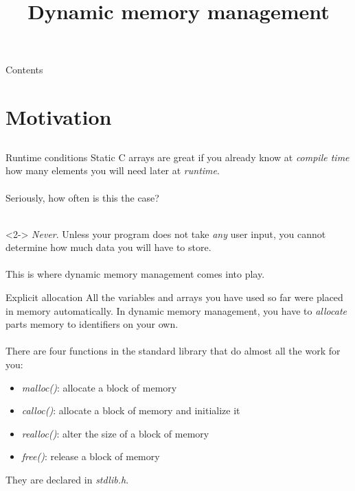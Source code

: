 
\newcommand{\topic}{
	Dynamic memory management
}
\usepackage{tikz}
\usetikzlibrary{arrows}
\usetikzlibrary{decorations.pathmorphing}

\title{\topic}
\supertitle{\course}
\date{}



\maketitle

\begin{frame}{Contents}
	\tableofcontents
\end{frame}

\section{Motivation}
\subsection{}
\begin{frame}{Runtime conditions}
	Static C arrays are great if you already know at \textit{compile time} how many elements you will need later at \textit{runtime}. \\ \ \\
	Seriously, how often is this the case? \\ \ \\
	\begin{uncoverenv}<2->
		\textit{Never}. Unless your program does not take \textit{any} user input, you cannot determine how much data you will have to store. \\ \ \\
		This is where dynamic memory management comes into play.
	\end{uncoverenv}
\end{frame}
\begin{frame}{Explicit allocation}
	All the variables and arrays you have used so far were placed in memory automatically. 
	In dynamic memory management, you have to \textit{allocate} parts memory to identifiers on your own. \\ \ \\
	There are four functions in the standard library that do almost all the work for you:
	\begin{itemize}
		\item \textit{malloc()}: allocate a block of memory
		\item \textit{calloc()}: allocate a block of memory and initialize it
		\item \textit{realloc()}: alter the size of a block of memory
		\item \textit{free()}: release a block of memory
	\end{itemize}
	They are declared in \textit{stdlib.h}.
\end{frame}
